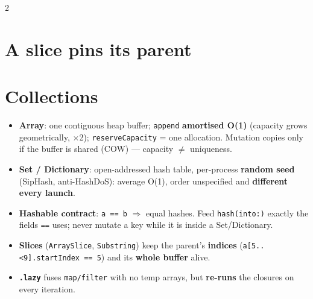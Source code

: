 \documentclass[8pt]{extarticle}
\begin{document}
\begin{multicols}{2}
\section{A slice pins its parent}

\columnbreak

\section{Collections}
\begin{itemize}
  \item \textbf{Array}: one contiguous heap buffer; \texttt{append}
        \textbf{amortised O(1)} (capacity grows geometrically, $\times$2);
        \texttt{reserveCapacity} = one allocation. Mutation copies only if
        the buffer is shared (COW) — capacity $\neq$ uniqueness.
  \item \textbf{Set / Dictionary}: open-addressed hash table, per-process
        \textbf{random seed} (SipHash, anti-HashDoS): average O(1), order
        unspecified and \textbf{different every launch}.
  \item \textbf{Hashable contract}: \texttt{a == b} $\Rightarrow$ equal
        hashes. Feed \texttt{hash(into:)} exactly the fields \texttt{==} uses;
        never mutate a key while it is inside a Set/Dictionary.
  \item \textbf{Slices} (\texttt{ArraySlice}, \texttt{Substring}) keep the
        parent's \textbf{indices} (\texttt{a[5..<9].startIndex == 5}) and its
        \textbf{whole buffer} alive.
  \item \textbf{\texttt{.lazy}} fuses \texttt{map/filter} with no temp arrays,
        but \textbf{re-runs} the closures on every iteration.
\end{itemize}


\end{multicols}
\end{document}
